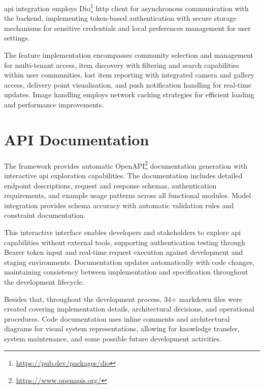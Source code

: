 \ac{api} integration employs Dio\footnote{\url{https://pub.dev/packages/dio}} \ac{http} client for asynchronous communication with the backend, implementing token-based authentication with secure storage mechanisms for sensitive credentials and local preferences management for user settings.

The feature implementation encompasses community selection and management for multi-tenant access, item discovery with filtering and search capabilities within user communities, lost item reporting with integrated camera and gallery access, delivery point visualisation, and push notification handling for real-time updates. Image handling employs network caching strategies for efficient loading and performance improvements.




\section{API Documentation} \label{section:api_documentation}

The framework provides automatic OpenAPI\footnote{\url{https://www.openapis.org/}} documentation generation with interactive \ac{api} exploration capabilities. The documentation includes detailed endpoint descriptions, request and response schemas, authentication requirements, and example usage patterns across all functional modules. Model integration provides schema accuracy with automatic validation rules and constraint documentation.

This interactive interface enables developers and stakeholders to explore \ac{api} capabilities without external tools, supporting authentication testing through Bearer token input and real-time request execution against development and staging environments. Documentation updates automatically with code changes, maintaining consistency between implementation and specification throughout the development lifecycle.

Besides that, throughout the development process, 34+ markdown files were created covering implementation details, architectural decisions, and operational procedures. Code documentation uses inline comments and architectural diagrams for visual system representations, allowing for knowledge transfer, system maintenance, and some possible future development activities.

